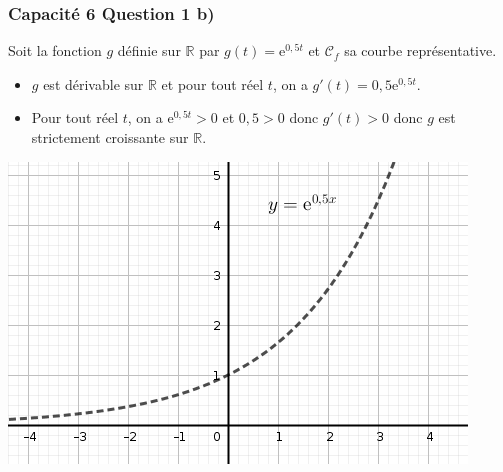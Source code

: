 \documentclass[11pt, hyperref={urlcolor=red,%
            linkcolor=blue, %
            colorlinks=true}]{beamer}
\newcommand{\R}{\mathbb{R}}
\newcommand{\courbe}[1]{\ensuremath{\mathcal{C}_{#1}}}
\begin{document}
\begin{frame}
\frametitle{Capacité 6 Question 1 b)}


Soit la fonction $g$ définie sur $\R$ par $g(t)=\text{e}^{0,5t}$ et $\courbe{f}$ sa courbe représentative.

\begin{itemize}
\item $g$ est dérivable sur $\R$  et pour tout réel $t$, on a $g'(t)=0,5\text{e}^{0,5t}$.
\item Pour tout réel $t$, on a $\text{e}^{0,5t}>0$ et $0,5>0$ donc $g'(t)>0$ donc $g$ est strictement croissante sur $\R$.
\end{itemize}

\begin{center}
\includegraphics[scale=0.3]{capacite6bis.png}
\end{center}


\end{frame}
\end{document}
